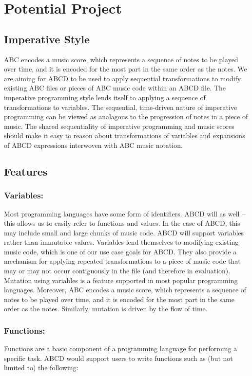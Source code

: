 \section{Potential Project}

\subsection{Imperative Style}
    ABC encodes a music score, which represents a sequence of notes to be played over time, and it is encoded for the most part in the same order as the notes. We are aiming for ABCD to be used to apply sequential transformations to modify existing ABC files or pieces of ABC music code within an ABCD file. The imperative programming style lends itself to applying a sequence of transformations to variables. The sequential, time-driven nature of imperative programming can be viewed as analagous to the progression of notes in a piece of music. The shared sequentiality of imperative programming and music scores should make it easy to reason about transformations of variables and expansions of ABCD expressions interwoven with ABC music notation.

\subsection{Features}
    \subsubsection{Variables:}
    Most programming languages have some form of identifiers. ABCD will as well -- this allows us to easily refer to functions and values. In the case of ABCD, this may include small and large chunks of music code. ABCD will support variables rather than immutable values. Variables lend themselves to modifying existing music code, which is one of our use case goals for ABCD. They also provide a mechanism for applying repeated transformations to a piece of music code that may or may not occur contiguously in the file (and therefore in evaluation). Mutation using variables is a feature supported in most popular programming languages. Moreover, ABC encodes a music score, which represents a sequence of notes to be played over time, and it is encoded for the most part in the same order as the notes. Similarly, mutation is driven by the flow of time. 
    
    \subsubsection{Functions:}
    Functions are a basic component of a programming language for performing a specific task. ABCD would support users to write functions such as (but not limited to) the following:

